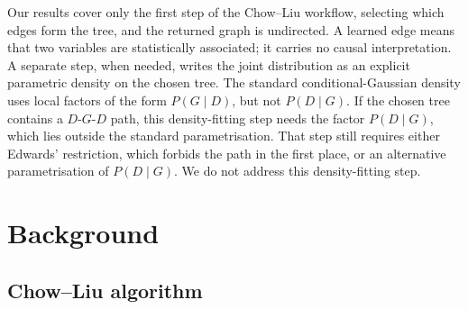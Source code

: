 Our results cover only the first step of the Chow--Liu workflow,
selecting which edges form the tree, and the returned graph is
undirected. A learned edge means that two variables are
statistically associated; it carries no causal interpretation. A
separate step, when needed, writes the joint distribution as an
explicit parametric density on the chosen tree. The standard
conditional-Gaussian density uses local factors of the form
$P(G \mid D)$, but not $P(D \mid G)$. If the chosen tree contains a
$D$-$G$-$D$ path, this density-fitting step needs the factor
$P(D \mid G)$, which lies outside the standard parametrisation. That step still requires either Edwards' restriction, which
forbids the path in the first place, or an alternative
parametrisation of $P(D \mid G)$. We do not address this
density-fitting step.

\section{Background}
\label{sec:background}

\subsection{Chow--Liu algorithm}
\label{subsec:chowliu}

